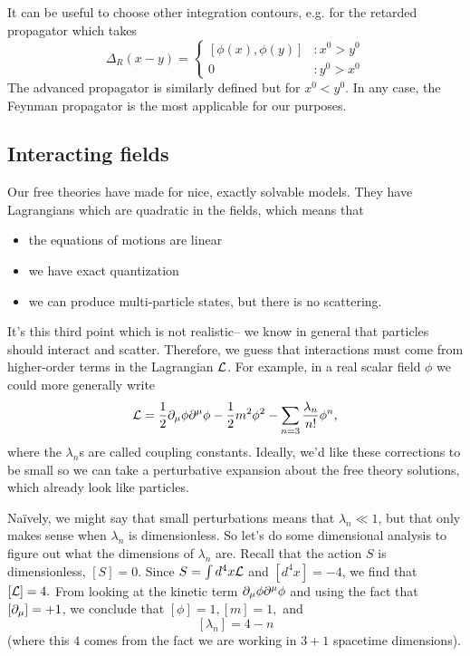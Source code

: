 It can be useful to choose other integration contours, e.g. for the retarded propagator which takes
$$\Delta_R(x-y)=\begin{cases}
[\phi(x),\phi(y)] &: x^0>y^0\\
0 &: y^0 > x^0
\end{cases}$$
The advanced propagator is similarly defined but for $x^0<y^0$. In any case, the Feynman propagator is the most applicable for our purposes.

\subsection*{Interacting fields} Our free theories have made for nice, exactly solvable models. They have Lagrangians which are quadratic in the fields, which means that
\begin{itemize}
    \item the equations of motions are linear
    \item we have exact quantization
    \item we can produce multi-particle states, but there is no scattering.
\end{itemize}

It's this third point which is not realistic-- we know in general that particles should interact and scatter. Therefore, we guess that interactions must come from higher-order terms in the Lagrangian $\mathcal L$. For example, in a real scalar field $\phi$ we could more generally write
$$\mathcal L=\frac{1}{2}\partial_\mu \phi \partial^\mu \phi -\frac{1}{2}m^2 \phi^2 - \sum_{n=3} \frac{\lambda_n}{n!} \phi^n,$$ where the $\lambda_n$s are called coupling constants. Ideally, we'd like these corrections to be small so we can take a perturbative expansion about the free theory solutions, which already look like particles.

Na\"ively, we might say that small perturbations means that $\lambda_n \ll 1$, but that only makes sense when $\lambda_n$ is dimensionless. So let's do some dimensional analysis to figure out what the dimensions of $\lambda_n$ are. Recall that the action $S$ is dimensionless, $[S]=0.$
Since $S=\int d^4 x \mathcal L$ and $[d^4x]=-4$, we find that $[\mathcal L]=4.$ From looking at the kinetic term $\partial_\mu \phi \partial^\mu \phi$ and using the fact that $[\partial_\mu]=+1$, we conclude that $[\phi]=1, [m]=1,$ and
$$[\lambda_n]=4-n$$ (where this $4$ comes from the fact we are working in $3+1$ spacetime dimensions).

